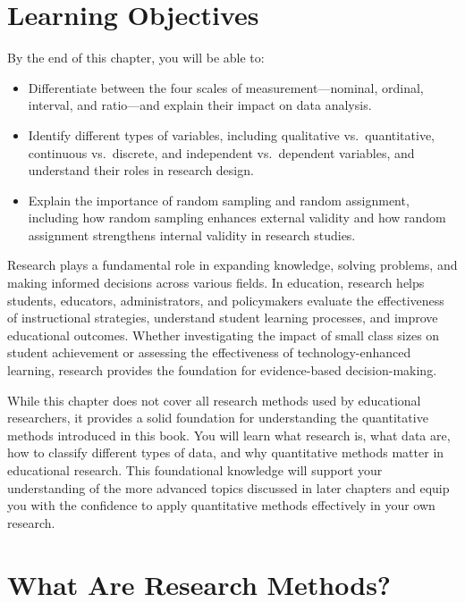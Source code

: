 \documentclass[
  letterpaper,
  DIV=11,
  numbers=noendperiod]{scrreprt}
\begin{document}
\section*{Learning Objectives}\label{learning-objectives}


By the end of this chapter, you will be able to:

\begin{itemize}
\item
  Differentiate between the four scales of measurement---nominal,
  ordinal, interval, and ratio---and explain their impact on data
  analysis.
\item
  Identify different types of variables, including qualitative
  vs.~quantitative, continuous vs.~discrete, and independent
  vs.~dependent variables, and understand their roles in research
  design.
\item
  Explain the importance of random sampling and random assignment,
  including how random sampling enhances external validity and how
  random assignment strengthens internal validity in research studies.
\end{itemize}

Research plays a fundamental role in expanding knowledge, solving
problems, and making informed decisions across various fields. In
education, research helps students, educators, administrators, and
policymakers evaluate the effectiveness of instructional strategies,
understand student learning processes, and improve educational outcomes.
Whether investigating the impact of small class sizes on student
achievement or assessing the effectiveness of technology-enhanced
learning, research provides the foundation for evidence-based
decision-making.

While this chapter does not cover all research methods used by
educational researchers, it provides a solid foundation for
understanding the quantitative methods introduced in this book. You will
learn what research is, what data are, how to classify different types
of data, and why quantitative methods matter in educational research.
This foundational knowledge will support your understanding of the more
advanced topics discussed in later chapters and equip you with the
confidence to apply quantitative methods effectively in your own
research.

\section{What Are Research Methods?}\label{what-are-research-methods}
\end{document}
